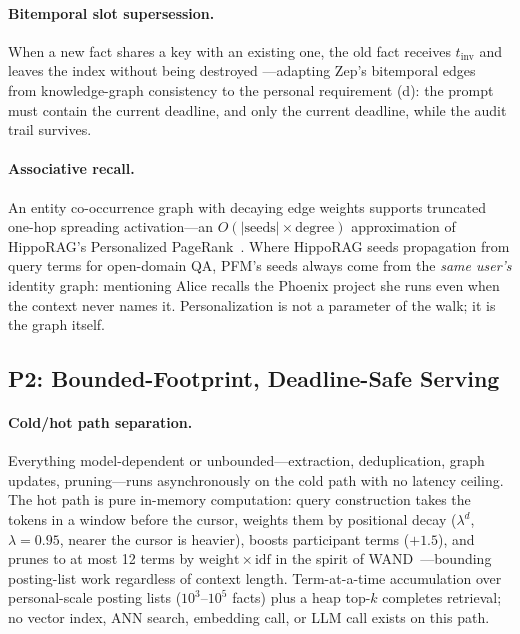 \documentclass[letterpaper]{article}
\begin{document}
\paragraph{Bitemporal slot supersession.}
When a new fact shares a $\mathrm{key}$ with an existing one, the old fact
receives $t_{\mathrm{inv}}$ and leaves the index without being destroyed
---adapting Zep's bitemporal edges~\citep{rasmussen2025zep} from
knowledge-graph consistency to the personal requirement (d): the prompt
must contain the current deadline, and only the current deadline, while
the audit trail survives.

\paragraph{Associative recall.}
An entity co-occurrence graph with decaying edge weights supports
truncated one-hop spreading activation---an $O(|\mathrm{seeds}| \times
\mathrm{degree})$ approximation of HippoRAG's Personalized
PageRank~\citep{gutierrez2024hipporag}. Where HippoRAG seeds propagation
from query terms for open-domain QA, PFM's seeds always come from the
\emph{same user's} identity graph: mentioning Alice recalls the Phoenix
project she runs even when the context never names it. Personalization is
not a parameter of the walk; it is the graph itself.

\subsection{P2: Bounded-Footprint, Deadline-Safe Serving}

\paragraph{Cold/hot path separation.}
Everything model-dependent or unbounded---extraction, deduplication,
graph updates, pruning---runs asynchronously on the cold path with no
latency ceiling. The hot path is pure in-memory computation:
query construction takes the tokens in a window before the cursor,
weights them by positional decay ($\lambda^d$, $\lambda{=}0.95$, nearer
the cursor is heavier), boosts participant terms ($+1.5$), and prunes to
at most 12 terms by $\mathrm{weight} \times \mathrm{idf}$ in the spirit of
WAND~\citep{broder2003efficient}---bounding posting-list work
regardless of context length. Term-at-a-time accumulation over
personal-scale posting lists ($10^3$--$10^5$ facts) plus a heap top-$k$
completes retrieval; no vector index, ANN search, embedding call, or LLM
call exists on this path.
\end{document}
